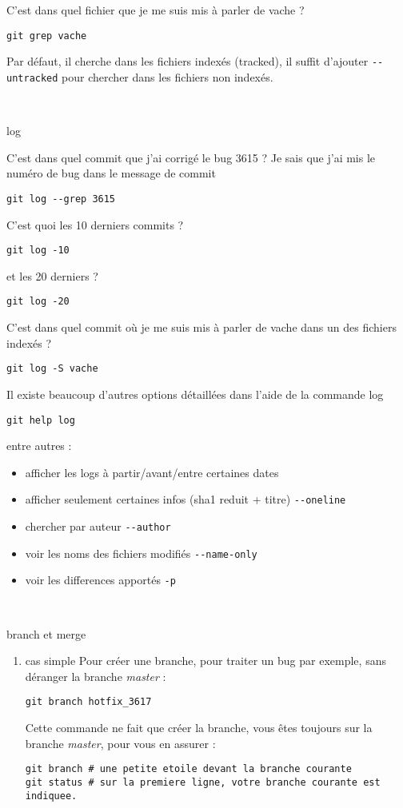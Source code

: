\documentclass[10pt]{exam}
\begin{document}
\begin{questions}
C'est dans quel fichier que je me suis mis à parler de vache ?
\begin{lstlisting}
git grep vache
\end{lstlisting}
Par défaut, il cherche dans les fichiers indexés (tracked), il suffit d'ajouter \texttt{-{}-untracked} pour chercher dans les fichiers non indexés.

~

\question log

C'est dans quel commit que j'ai corrigé le bug 3615 ? Je sais que j'ai mis le numéro de bug dans le message de commit
\begin{lstlisting}
git log --grep 3615
\end{lstlisting}

C'est quoi les 10 derniers commits ?
\begin{lstlisting}
git log -10
\end{lstlisting}
et les 20 derniers ?
\begin{lstlisting}
git log -20
\end{lstlisting}

C'est dans quel commit où je me suis mis à parler de vache dans un des fichiers indexés ?
\begin{lstlisting}
git log -S vache
\end{lstlisting}

Il existe beaucoup d'autres options détaillées dans l'aide de la commande log
\begin{lstlisting}
git help log
\end{lstlisting}
entre autres :
\begin{itemize}
\item afficher les logs à partir/avant/entre certaines dates
\item afficher seulement certaines infos (sha1 reduit + titre) \texttt{-{}-oneline}
\item chercher par auteur \texttt{-{}-author}
\item voir les noms des fichiers modifiés \texttt{-{}-name-only}
\item voir les differences apportés \texttt{-p}
\end{itemize}

~

\question branch et merge
\begin{enumerate}
\item cas simple
  Pour créer une branche, pour traiter un bug par exemple, sans déranger la branche \emph{master} :
\begin{lstlisting}
git branch hotfix_3617
\end{lstlisting}
Cette commande ne fait que créer la branche, vous êtes toujours sur la branche \emph{master}, pour vous en assurer :
\begin{lstlisting}
git branch # une petite etoile devant la branche courante
git status # sur la premiere ligne, votre branche courante est indiquee.
\end{lstlisting}


\end{enumerate}
\end{questions}
\end{document}

